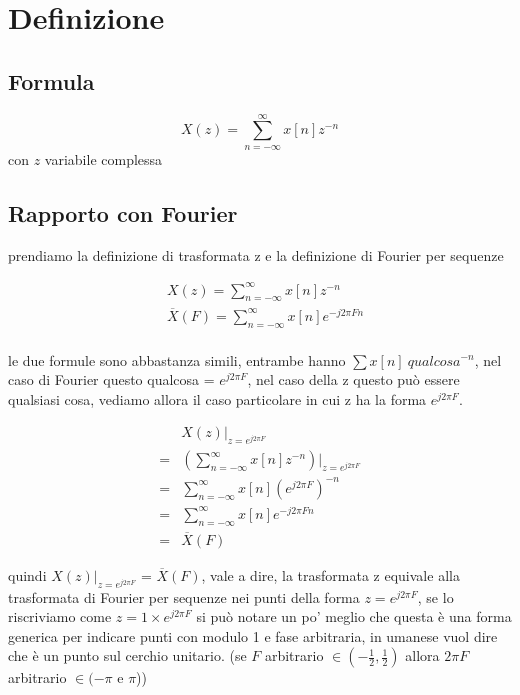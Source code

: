 \documentclass[11pt]{article}
\date{\today}
\title{}
\begin{document}
\tableofcontents

\section{Definizione}
\label{sec:org22af5c0}
\subsection{Formula}
\label{sec:org8033981}
\[
X(z) = \sum_{n=-\infty}^{\infty} x[n] z^{-n}
\]
con \(z\) variabile complessa

\subsection{Rapporto con Fourier}
\label{sec:orga5ca6c9}
prendiamo la definizione di trasformata z e la definizione di Fourier
per sequenze

\begin{align*}
&X(z) = \sum_{n=-\infty}^{\infty} x[n] z^{-n} \\
&\overline{X}(F) = \sum_{n=-\infty}^{\infty} x[n] e^{-j2\pi Fn} \\
\end{align*}

le due formule sono abbastanza simili, entrambe hanno \(\sum x[n]\
qualcosa^{-n}\), nel caso di Fourier questo qualcosa = \(e^{j2\pi F}\),
nel caso della z questo può essere qualsiasi cosa, vediamo allora il
caso particolare in cui z ha la forma \(e^{j2\pi F}\).

\begin{align*}
  &X(z) \rvert _{z = e^{j2\pi F}} \\
= &(\sum_{n=-\infty}^{\infty} x[n] z^{-n})\rvert _{z = e^{j2\pi F}} \\
= & \sum_{n=-\infty}^{\infty} x[n] (e^{j2\pi F})^{-n} \\
= & \sum_{n=-\infty}^{\infty} x[n] e^{-j2\pi Fn} \\
= & \overline{X}(F)
\end{align*}

quindi \(X(z) \rvert _{z = e^{j2\pi F}}\) = \(\overline{X}(F)\), vale a
dire, la trasformata z equivale alla trasformata di Fourier per
sequenze nei punti della forma \(z = e^{j2\pi F}\), se lo riscriviamo
come \(z = 1 \times e^{j2\pi F}\) si può notare un po' meglio che questa
è una forma generica per indicare punti con modulo 1 e fase
arbitraria, in umanese vuol dire che è un punto sul cerchio unitario.
(se \(F\) arbitrario \(\in (-\frac{1}{2},\frac{1}{2})\) allora \(2\pi F\)
arbitrario \(\in (-\pi\) e \(\pi\)))
\end{document}
